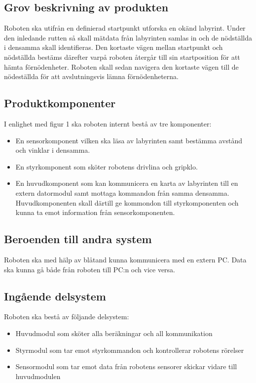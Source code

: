 \documentclass[11pt]{article}
\begin{document}
\begin{flushleft}
\subsection{Grov beskrivning av produkten}

Roboten ska utifrån en definierad startpunkt utforska en okänd labyrint. Under den inledande rutten så skall mätdata från labyrinten samlas in och de nödställda i densamma skall identifieras. Den kortaste vägen mellan startpunkt och nödställda bestäms därefter varpå roboten återgår till sin startposition för att hämta förnödenheter. Roboten skall sedan navigera den kortaste vägen till de nödeställda för att avslutningsvis lämna förnödenheterna.

\subsection{Produktkomponenter}

I enlighet med figur 1 ska roboten internt bestå av tre komponenter:
\begin{itemize}
\item{En sensorkomponent vilken ska läsa av labyrinten samt bestämma avstånd och vinklar i densamma.} 
\item{En styrkomponent som sköter robotens drivlina och gripklo.}
\item{En huvudkomponent som kan kommunicera en karta av labyrinten till en extern datormodul samt mottaga kommandon från samma densamma. Huvudkomponenten skall därtill ge kommondon till styrkomponenten och kunna ta emot information från sensorkomponenten.}  
\end{itemize}  


\subsection{Beroenden till andra system}

Roboten ska med hälp av blåtand kunna kommunicera med en extern PC. Data ska kunna gå både från roboten till PC:n och vice versa.

\subsection{Ingående delsystem}
Roboten ska bestå av följande delsystem:
\begin{itemize}
	\item Huvudmodul som sköter alla beräkningar och all kommunikation
	\item Styrmodul som tar emot styrkommandon och kontrollerar robotens rörelser
	\item Sensormodul som tar emot data från robotens sensorer skickar vidare till huvudmodulen
\end{itemize}


\end{flushleft}
\end{document}
